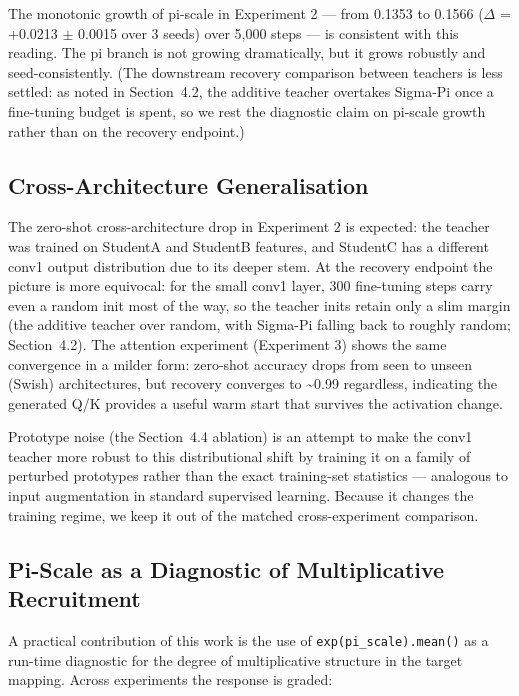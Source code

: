 \documentclass{article}
\begin{document}
The monotonic growth of pi-scale in Experiment 2 --- from 0.1353 to 0.1566 ($\Delta$ = +0.0213 $\pm$ 0.0015 over 3 seeds) over 5,000 steps --- is consistent with this reading. The pi branch is not growing dramatically, but it grows robustly and seed-consistently. (The downstream recovery comparison between teachers is less settled: as noted in Section~4.2, the additive teacher overtakes Sigma-Pi once a fine-tuning budget is spent, so we rest the diagnostic claim on pi-scale growth rather than on the recovery endpoint.)

\subsection{Cross-Architecture Generalisation}\label{cross-architecture-generalisation}

The zero-shot cross-architecture drop in Experiment 2 is expected: the teacher was trained on StudentA and StudentB features, and StudentC has a different conv1 output distribution due to its deeper stem. At the recovery endpoint the picture is more equivocal: for the small conv1 layer, 300 fine-tuning steps carry even a random init most of the way, so the teacher inits retain only a slim margin (the additive teacher over random, with Sigma-Pi falling back to roughly random; Section~4.2). The attention experiment (Experiment 3) shows the same convergence in a milder form: zero-shot accuracy drops from seen to unseen (Swish) architectures, but recovery converges to \textasciitilde0.99 regardless, indicating the generated Q/K provides a useful warm start that survives the activation change.

Prototype noise (the Section~4.4 ablation) is an attempt to make the conv1 teacher more robust to this distributional shift by training it on a family of perturbed prototypes rather than the exact training-set statistics --- analogous to input augmentation in standard supervised learning. Because it changes the training regime, we keep it out of the matched cross-experiment comparison.

\subsection{Pi-Scale as a Diagnostic of Multiplicative Recruitment}\label{pi-scale-as-a-diagnostic-of-multiplicative-recruitment}

A practical contribution of this work is the use of \texttt{exp(pi\_scale).mean()} as a run-time diagnostic for the degree of multiplicative structure in the target mapping. Across experiments the response is graded:
\end{document}
